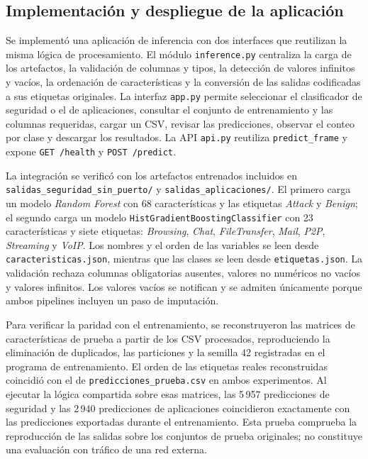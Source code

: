 \documentclass[conference]{IEEEtran}
\begin{document}
\subsection{Implementación y despliegue de la aplicación}
\label{sec:res_app}

Se implementó una aplicación de inferencia con dos interfaces que reutilizan la misma lógica de procesamiento. El módulo \texttt{inference.py} centraliza la carga de los artefactos, la validación de columnas y tipos, la detección de valores infinitos y vacíos, la ordenación de características y la conversión de las salidas codificadas a sus etiquetas originales. La interfaz \texttt{app.py} permite seleccionar el clasificador de seguridad o el de aplicaciones, consultar el conjunto de entrenamiento y las columnas requeridas, cargar un CSV, revisar las predicciones, observar el conteo por clase y descargar los resultados. La API \texttt{api.py} reutiliza \texttt{predict\_frame} y expone \texttt{GET /health} y \texttt{POST /predict}.

La integración se verificó con los artefactos entrenados incluidos en \texttt{salidas\_seguridad\_sin\_puerto/} y \texttt{salidas\_aplicaciones/}. El primero carga un modelo \textit{Random Forest} con 68 características y las etiquetas \textit{Attack} y \textit{Benign}; el segundo carga un modelo \texttt{HistGradientBoostingClassifier} con 23 características y siete etiquetas: \textit{Browsing}, \textit{Chat}, \textit{FileTransfer}, \textit{Mail}, \textit{P2P}, \textit{Streaming} y \textit{VoIP}. Los nombres y el orden de las variables se leen desde \texttt{caracteristicas.json}, mientras que las clases se leen desde \texttt{etiquetas.json}. La validación rechaza columnas obligatorias ausentes, valores no numéricos no vacíos y valores infinitos. Los valores vacíos se notifican y se admiten únicamente porque ambos pipelines incluyen un paso de imputación.

Para verificar la paridad con el entrenamiento, se reconstruyeron las matrices de características de prueba a partir de los CSV procesados, reproduciendo la eliminación de duplicados, las particiones y la semilla 42 registradas en el programa de entrenamiento. El orden de las etiquetas reales reconstruidas coincidió con el de \texttt{predicciones\_prueba.csv} en ambos experimentos. Al ejecutar la lógica compartida sobre esas matrices, las 5\,957 predicciones de seguridad y las 2\,940 predicciones de aplicaciones coincidieron exactamente con las predicciones exportadas durante el entrenamiento. Esta prueba comprueba la reproducción de las salidas sobre los conjuntos de prueba originales; no constituye una evaluación con tráfico de una red externa.
\end{document}
